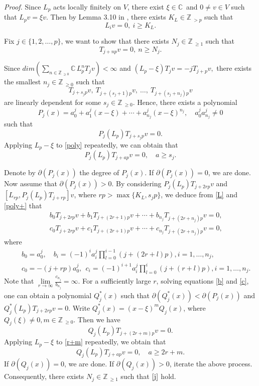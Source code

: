 \documentclass[12pt]{article}
\def\ssc{\scriptscriptstyle}
\def\Z{\mathbb{Z}{\ssc\,}}
\def\C{\mathbb{C}{\ssc\,}}
\numberwithin{equation}{section}
\begin{document}
{\it Proof.}  Since $L_p$ acts locally finitely on $V$, there exist $\xi\in\C$  and $0\ne v\in V$ such that
$L_pv=\xi v$. Then by Lemma 3.10 in \cite{MNTZ}, there exists $K_L\in\Z_{>p}$ such that
\begin{equation}\label{L}L_iv=0,\ i\ge K_L.
\end{equation}

Fix $j\in\{1,2,\ldots,p\}$, we want to show that there exists $N_j\in\Z_{\ge 1}$ such that
\begin{equation}\label{j}T_{j+np}v=0,\ n\ge N_j.
\end{equation}


 Since $dim(\sum\limits_{n\in\Z_{\ge 0}}\C L^n_pT_{j}v)<\infty$ and $(L_p-\xi)T_{j}v=-jT_{j+p}v,$
there exists the smallest $n_j\in\Z_{\ge 0}$ such that
$$T_{j+s_jp}v,\ T_{j+(s_j+1)p}v,\ \ldots,\ T_{j+(s_j+n_j)p}v$$
are linearly dependent for some $s_j\in\Z_{\ge 0}.$ Hence, there exists a polynomial
$$P_j(x)=a_0^j+a_1^j(x-\xi)+\cdots + a^j_{n_j}(x-\xi)^{n_j},\quad a_0^ja^j_{n_j}\ne 0$$
such that
\begin{equation}\label{poly}P_j(L_p)T_{j+s_jp}v=0.
\end{equation}
Applying $L_p-\xi$ to \eqref{poly} repeatedly, we can obtain that
\begin{equation}\label{poly+}P_j(L_p)T_{j+ap}v=0,\quad a\ge s_j.
\end{equation}

Denote by $\partial(P_j(x))$ the degree of $P_j(x)$. If $\partial(P_j(x))=0$, we are done. Now assume that $\partial(P_j(x))>0$.
 By considering $P_j(L_p)T_{j+2rp}v$ and $[L_{rp},P_j(L_p)T_{j+rp}]v$, where $rp>\max\{K_L, s_jp\}$, we deduce from \eqref{L} and \eqref{poly+} that
 \begin{eqnarray}\label{b}&&b_0T_{j+2rp}v+b_1T_{j+(2r+1)p}v+\cdots +b_{n_j}T_{j+(2r+n_j)p}v=0,\\
&&\label{c}c_0T_{j+2rp}v+c_1T_{j+(2r+1)p}v+\cdots +c_{n_j}T_{j+(2r+n_j)p}v=0,
 \end{eqnarray}
where
\begin{eqnarray*}&&b_0=a_0^j ,\quad b_i=(-1)^{i}a_i^j\prod_{l=0}^{i-1}\left(j+(2r+l)p\right),i=1,\ldots,n_j,\\
&&c_0=-(j+rp)a_0^j, \ \ c_i=(-1)^{i+1}a_i^j\prod_{l=0}^{i}\left(j+(r+l)p\right),i=1,\ldots,n_j.
\end{eqnarray*}
Note that $\lim\limits_{r\rightarrow \infty}\frac{c_{n_j}}{b_{n_j}}=\infty$. For a sufficiently large $r$, solving equations  \eqref{b} and \eqref{c}, one can obtain  a polynomial $Q^*_j(x)$  such that
$\partial(Q^*_j(x))<\partial(P_j(x))$ and $Q^*_j(L_p)T_{j+2rp}v=0$. Write $Q^*_j(x)=(x-\xi)^{m}Q_j(x)$, where $Q_j(\xi)\ne 0, m\in\Z_{\ge 0}$. Then we have
\begin{equation}\label{r+m}Q_j(L_p)T_{j+(2r+m)p}v=0.
\end{equation}  Applying $L_p-\xi$ to \eqref{r+m} repeatedly,
we obtain that
$$Q_j(L_p)T_{j+ap}v=0,\quad a\ge 2r+m.$$
If $\partial(Q_j(x))=0$, we are done. If $\partial(Q_j(x))>0$, iterate the above process. Consequently, there exists  $N_j\in \Z_{\ge 1}$ such that $\eqref{j}$ hold.
\end{document}
